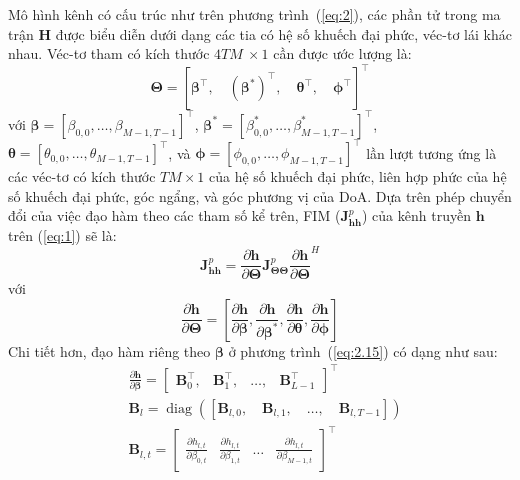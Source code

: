 Mô hình kênh có cấu trúc như trên phương trình~(\ref{eq:2}), các phần tử trong ma trận $\mathbf{H}$ được biểu diễn dưới dạng các tia có hệ số khuếch đại phức, véc-tơ lái khác nhau. Véc-tơ tham có kích thước $4TM~\times 1$ cần được ước lượng là:
\begin{equation}
    \boldsymbol{\Theta}=\left[ \boldsymbol{\beta}^\top, \quad \boldsymbol{(\beta^*)}^\top, \quad \boldsymbol{\theta}^\top, \quad \boldsymbol{\phi}^\top \right]^\top
\end{equation}
với $\boldsymbol{\beta}=\left[\beta_{0,0}, \ldots, \beta_{M-1, T -1}\right]^{\top}$, $\boldsymbol{\beta^*}=\left[\beta^*_{0,0}, \ldots, \beta^*_{M-1, T - 1}\right]^{\top}$, $\boldsymbol{\theta}=\left[\theta_{0,0}, \ldots, \theta_{M-1, T - 1}\right]^{\top}$, và $\boldsymbol{\phi}=\left[\phi_{0,0}, \ldots, \phi_{M-1, T - 1}\right]^{\top}$ lần lượt tương ứng là các véc-tơ có kích thước $TM \times 1$ của hệ số khuếch đại phức, liên hợp phức của hệ số khuếch đại phức, góc ngẩng, và góc phương vị của DoA. Dựa trên phép chuyển đổi của việc đạo hàm theo các tham số kể trên, FIM ($\mathbf{J}^p_{\mathbf{h} \mathbf{h}}$) của kênh truyền $\mathbf{h}$ trên (\ref{eq:1}) sẽ là:
\begin{equation}
\label{eq:13}
    \mathbf{J}^p_{\mathbf{h} \mathbf{h}}=\frac{\partial \mathbf{h}}{\partial \boldsymbol{\Theta}} \mathbf{J}^p_{\boldsymbol{\Theta} \boldsymbol{\Theta}} {\frac{\partial \mathbf{h}}{\partial \boldsymbol{\Theta}}}^{H}
\end{equation}
với 
\begin{equation}
\label{eq:2.15}
    \frac{\partial \mathbf{h}}{\partial \boldsymbol{\Theta}}=
    \left[\frac{\partial \mathbf{h}}{\partial \boldsymbol{\beta}}, 
    \frac{\partial \mathbf{h}}{\partial \boldsymbol{\beta^*}},
    \frac{\partial \mathbf{h}}{\partial \boldsymbol{\theta}}, 
    \frac{\partial \mathbf{h}}{\partial \boldsymbol{\phi}}\right]
\end{equation}
Chi tiết hơn, đạo hàm riêng theo $\boldsymbol{\beta}$ ở phương trình~(\ref{eq:2.15}) có dạng như sau:
\begin{subequations}
    \begin{align}
    &\frac{\partial \mathbf{h}}{\partial \boldsymbol{\beta}}=
    \left[\begin{array}{llll}
        \boldsymbol{B}_{0}^{\top}, & \boldsymbol{B}_{1}^{\top}, & \ldots, & \boldsymbol{B}_{L - 1}^{\top}
    \end{array}\right]^{\top}\\
    &\boldsymbol{B}_{l}=\operatorname{diag}\left(\left[\boldsymbol{B}_{l, 0}, \quad \boldsymbol{B}_{l, 1}, \quad \ldots, \quad \boldsymbol{B}_{l, T - 1}\right]\right) \\
    &\boldsymbol{B}_{l, t}=\left[\begin{array}{cccc}
        \frac{\partial h_{l, t}}{\partial \beta_{0, t}} &
        \frac{\partial h_{l, t}}{\partial \beta_{1, t}} & 
        \ldots & 
        \frac{\partial h_{l, t}}{\partial \beta_{M-1, t}}
    \end{array}\right]^\top
    \end{align}
\end{subequations}
